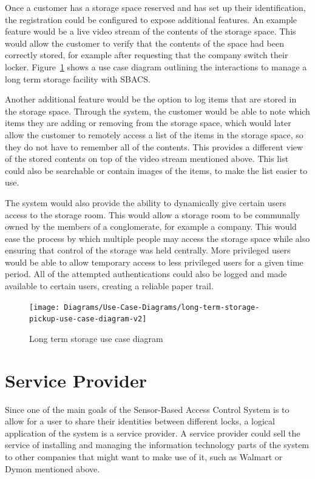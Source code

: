 \documentclass[12pt]{report}
\let\Oldsection\section
\renewcommand{\section}{\FloatBarrier\Oldsection}
\begin{document}
Once a customer has a storage space reserved and has set up their identification, the registration could be configured
to expose additional features. An example feature would be a live video stream of the contents of the storage space.
This would allow the customer to verify that the contents of the space had been correctly stored, for example after
requesting that the company switch their locker. Figure~\ref{fig:long-term-storage-pickup-use-case-diagram} shows
a use case diagram outlining the interactions to manage a long term storage facility with SBACS.

Another additional feature would be the option to log items that are stored in the storage space. Through the system, the
customer would be able to note which items they are adding or removing from the storage space, which would later allow the
customer to remotely access a list of the items in the storage space, so they do not have to remember all of the contents.
This provides a different view of the stored contents on top of the video stream mentioned above. This list could also be
searchable or contain images of the items, to make the list easier to use.

The system would also provide the ability to dynamically give certain users access to the storage room. This would allow
a storage room to be communally owned by the members of a conglomerate, for example a company. This would ease the
process by which multiple people may access the storage space while also ensuring that control of the storage was held
centrally. More privileged users would be able to allow temporary access to less privileged users for a given time
period. All of the attempted authentications could also be logged and made available to certain users, creating a
reliable paper trail.

\begin{figure}
    \texttt{[image: Diagrams/Use-Case-Diagrams/long-term-storage-pickup-use-case-diagram-v2]}
    \caption{Long term storage use case diagram}
    \label{fig:long-term-storage-pickup-use-case-diagram}
\end{figure}


\section{Service Provider} \label{service-provider}

Since one of the main goals of the Sensor-Based Access Control System is to allow for a user to share their identities
between different locks, a logical application of the system is a service provider. A service provider could sell the service
of installing and managing the information technology parts of the system to other companies that might want to
make use of it, such as Walmart or Dymon mentioned above.
\end{document}
